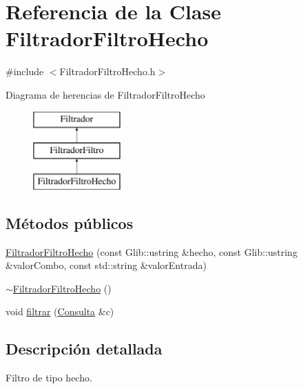 \hypertarget{classFiltradorFiltroHecho}{\section{\-Referencia de la \-Clase \-Filtrador\-Filtro\-Hecho}
\label{classFiltradorFiltroHecho}
}


{\ttfamily \#include $<$\-Filtrador\-Filtro\-Hecho.\-h$>$}

\-Diagrama de herencias de \-Filtrador\-Filtro\-Hecho\begin{figure}[H]
\begin{center}
\leavevmode
\includegraphics[height=3.000000cm]{classFiltradorFiltroHecho}
\end{center}
\end{figure}
\subsection*{\-Métodos públicos}
\begin{DoxyCompactItemize}
\item 
\hyperlink{classFiltradorFiltroHecho_a7b39688beadb39e91f628302074ca44e}{\-Filtrador\-Filtro\-Hecho} (const \-Glib\-::ustring \&hecho, const \-Glib\-::ustring \&valor\-Combo, const std\-::string \&valor\-Entrada)
\item 
\hyperlink{classFiltradorFiltroHecho_a28657def013a181ed7e8c12a1cc04c31}{$\sim$\-Filtrador\-Filtro\-Hecho} ()
\item 
void \hyperlink{classFiltradorFiltroHecho_a87413cf51710bfd0813d0db87c9a1c11}{filtrar} (\hyperlink{classConsulta}{\-Consulta} \&c)
\end{DoxyCompactItemize}


\subsection{\-Descripción detallada}
\-Filtro de tipo hecho. 

